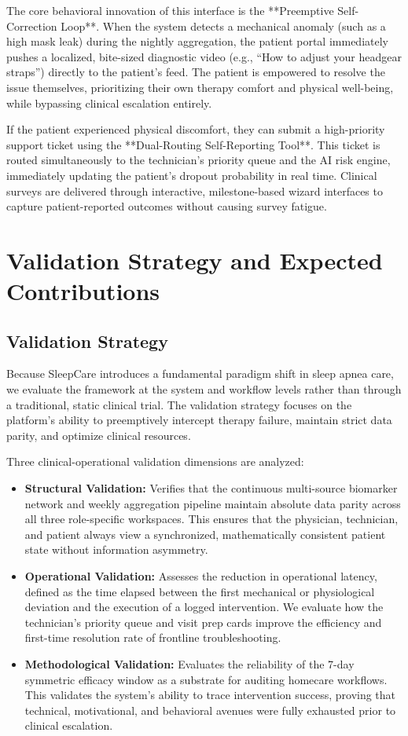 \documentclass[conference]{IEEEtran}
\begin{document}
The core behavioral innovation of this interface is the **Preemptive Self-Correction Loop**. When the system detects a mechanical anomaly (such as a high mask leak) during the nightly aggregation, the patient portal immediately pushes a localized, bite-sized diagnostic video (e.g., ``How to adjust your headgear straps'') directly to the patient's feed. The patient is empowered to resolve the issue themselves, prioritizing their own therapy comfort and physical well-being, while bypassing clinical escalation entirely.

If the patient experienced physical discomfort, they can submit a high-priority support ticket using the **Dual-Routing Self-Reporting Tool**. This ticket is routed simultaneously to the technician's priority queue and the AI risk engine, immediately updating the patient's dropout probability in real time. Clinical surveys are delivered through interactive, milestone-based wizard interfaces to capture patient-reported outcomes without causing survey fatigue.

\section{Validation Strategy and Expected Contributions}

\subsection{Validation Strategy}
Because SleepCare introduces a fundamental paradigm shift in sleep apnea care, we evaluate the framework at the system and workflow levels rather than through a traditional, static clinical trial. The validation strategy focuses on the platform's ability to preemptively intercept therapy failure, maintain strict data parity, and optimize clinical resources.

Three clinical-operational validation dimensions are analyzed:
\begin{itemize}
\item \textbf{Structural Validation:} Verifies that the continuous multi-source biomarker network and weekly aggregation pipeline maintain absolute data parity across all three role-specific workspaces. This ensures that the physician, technician, and patient always view a synchronized, mathematically consistent patient state without information asymmetry.
\item \textbf{Operational Validation:} Assesses the reduction in operational latency, defined as the time elapsed between the first mechanical or physiological deviation and the execution of a logged intervention. We evaluate how the technician's priority queue and visit prep cards improve the efficiency and first-time resolution rate of frontline troubleshooting.
\item \textbf{Methodological Validation:} Evaluates the reliability of the 7-day symmetric efficacy window as a substrate for auditing homecare workflows. This validates the system's ability to trace intervention success, proving that technical, motivational, and behavioral avenues were fully exhausted prior to clinical escalation.
\end{itemize}
\end{document}
